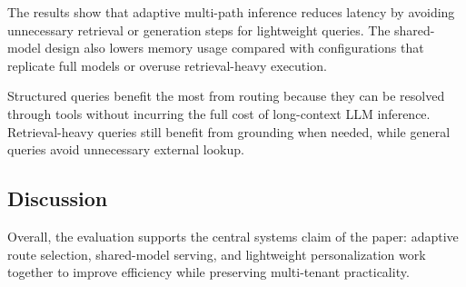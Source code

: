 The results show that adaptive multi-path inference reduces latency by avoiding unnecessary retrieval or generation steps for lightweight queries. The shared-model design also lowers memory usage compared with configurations that replicate full models or overuse retrieval-heavy execution.

Structured queries benefit the most from routing because they can be resolved through tools without incurring the full cost of long-context LLM inference. Retrieval-heavy queries still benefit from grounding when needed, while general queries avoid unnecessary external lookup.

\subsection{Discussion}

Overall, the evaluation supports the central systems claim of the paper: adaptive route selection, shared-model serving, and lightweight personalization work together to improve efficiency while preserving multi-tenant practicality.
